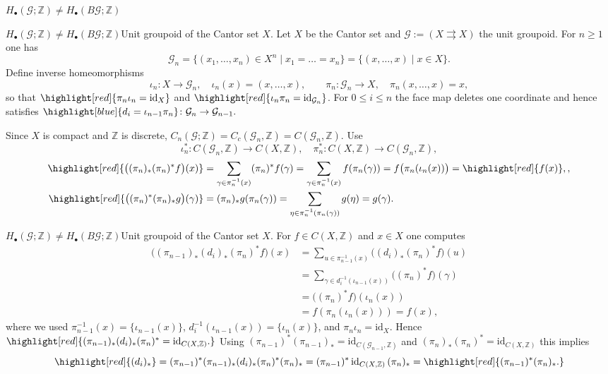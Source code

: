 \documentclass[aspectratio=169]{beamer}
\newcommand{\G}{\mathcal{G}}
\newcommand{\ZZ}{\mathbb{Z}}
\begin{document}
\begin{frame}[plain,c]
  \begin{center}
    \Huge $H_\bullet(\G;\ZZ) \neq H_\bullet(B\G;\ZZ)$
  \end{center}
\end{frame}

\begin{frame}{$H_\bullet(\G;\ZZ) \neq H_\bullet(B\G;\ZZ)$}{Unit groupoid of the Cantor set $X$.}
Let $X$ be the Cantor set and ${\G}:=(X \rightrightarrows X)$ the unit groupoid.
For $n\ge 1$ one has
\[
{\G}_n=\{(x_1,\dots,x_n)\in X^n \mid x_1=\dots=x_n\}
=\{(x,\dots,x)\mid x\in X\}.
\]\pause
Define inverse homeomorphisms
\[
\iota_n\colon X\to {\G}_n,
\quad
\iota_n(x)=(x,\dots,x),
\qquad
\pi_n\colon {\G}_n\to X,
\quad
\pi_n(x,\dots,x)=x,
\]
so that $\highlight[red]{\pi_n\iota_n=\mathrm{id}_X}$ and $\highlight[red]{\iota_n\pi_n=\mathrm{id}_{{\G}_n}}$.\pause 
For $0\le i\le n$ the face map deletes one coordinate and hence satisfies
\(
\highlight[blue]{d_i=\iota_{n-1}\pi_n} \colon {\G}_n\to {\G}_{n-1}.
\)

Since $X$ is compact and $\ZZ$ is discrete,
\(
C_n({\G};\ZZ)=C_c({\G}_n,\ZZ)=C({\G}_n,\ZZ).
\)\pause
Use
\[
\iota_n^*\colon C({\G}_n,\ZZ)\to C(X,\ZZ), \quad
\pi_n^*\colon C(X,\ZZ)\to C({\G}_n,\ZZ),
\]
\[
\begin{aligned}
\highlight[red]{\bigl((\pi_n)_*(\pi_n)^*f\bigr)(x)} &= \sum_{\gamma\in \pi_n^{-1}(x)} (\pi_n)^*f(\gamma) = \sum_{\gamma\in \pi_n^{-1}(x)} f(\pi_n(\gamma)) = f\bigl(\pi_n(\iota_n(x))\bigr) = \highlight[red]{f(x)},
,\\
\highlight[red]{\bigl((\pi_n)^*(\pi_n)_*g\bigr)(\gamma)} &= (\pi_n)_*g(\pi_n(\gamma)) = \sum_{\eta\in \pi_n^{-1}(\pi_n(\gamma))} g(\eta) = g(\gamma).
\end{aligned}
\]
\end{frame}

\begin{frame}{$H_\bullet(\G;\ZZ) \neq H_\bullet(B\G;\ZZ)$}{Unit groupoid of the Cantor set $X$.}
For $f\in C(X,\ZZ)$ and $x\in X$ one computes
\[
\begin{aligned}
\bigl((\pi_{n-1})_*(d_i)_*(\pi_n)^*f\bigr)(x)
&=
\sum_{u\in \pi_{n-1}^{-1}(x)} \bigl((d_i)_*(\pi_n)^*f\bigr)(u)\\
&=
\sum_{\gamma\in d_i^{-1}(\iota_{n-1}(x))} \bigl((\pi_n)^*f\bigr)(\gamma)\\
&=
\bigl((\pi_n)^*f\bigr)(\iota_n(x))\\
&=
f(\pi_n(\iota_n(x)))
=
f(x),
\end{aligned}
\]
where we used $\pi_{n-1}^{-1}(x)=\{\iota_{n-1}(x)\}$, $d_i^{-1}(\iota_{n-1}(x))=\{\iota_n(x)\}$, and $\pi_n\iota_n=\mathrm{id}_X$.
Hence
\(
\highlight[red]{(\pi_{n-1})_*(d_i)_*(\pi_n)^*=\mathrm{id}_{C(X,\ZZ)}.}
\)\pause
Using $(\pi_{n-1})^*(\pi_{n-1})_*=\mathrm{id}_{C(\G_{n-1},\ZZ)}$ and $(\pi_n)_*(\pi_n)^*=\mathrm{id}_{C(X,\ZZ)}$ this implies
\[
\highlight[red]{(d_i)_*}=(\pi_{n-1})^*(\pi_{n-1})_*(d_i)_*(\pi_n)^*(\pi_n)_*=(\pi_{n-1})^*\,\mathrm{id}_{C(X,\ZZ)}\,(\pi_n)_*=\highlight[red]{(\pi_{n-1})^*(\pi_n)_*.}
\]
\end{frame}
\end{document}
